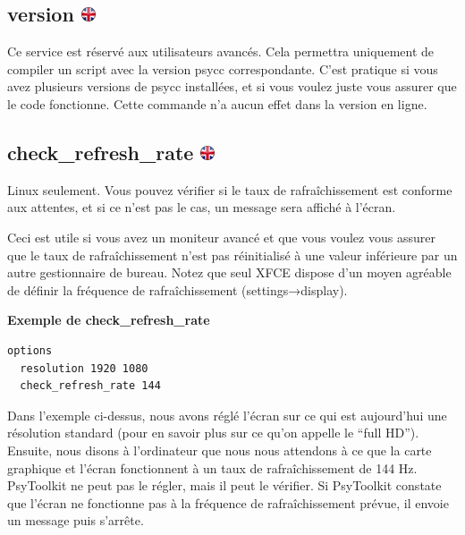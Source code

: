 \documentclass[
]{book}
\begin{document}
\hypertarget{version}{%
\subsection[version ]{\texorpdfstring{version
\href{https://www.psytoolkit.org/doc3.2.0/syntax.html\#options-version}{\protect\includegraphics{img/ukflag.png}}}{version }}\label{version}}

Ce service est réservé aux utilisateurs avancés. Cela permettra
uniquement de compiler un script avec la version psycc correspondante.
C'est pratique si vous avez plusieurs versions de psycc installées, et
si vous voulez juste vous assurer que le code fonctionne. Cette commande
n'a aucun effet dans la version en ligne.

\hypertarget{check_refresh_rate}{%
\subsection[check\_refresh\_rate ]{\texorpdfstring{check\_refresh\_rate
\href{https://www.psytoolkit.org/doc3.2.0/syntax.html\#options-check-refresh-rate}{\protect\includegraphics{img/ukflag.png}}}{check\_refresh\_rate }}\label{check_refresh_rate}}

Linux seulement. Vous pouvez vérifier si le taux de rafraîchissement est
conforme aux attentes, et si ce n'est pas le cas, un message sera
affiché à l'écran.

Ceci est utile si vous avez un moniteur avancé et que vous voulez vous
assurer que le taux de rafraîchissement n'est pas réinitialisé à une
valeur inférieure par un autre gestionnaire de bureau. Notez que seul
XFCE dispose d'un moyen agréable de définir la fréquence de
rafraîchissement (settings→display).

\textbf{Exemple de check\_refresh\_rate}

\begin{verbatim}
options
  resolution 1920 1080
  check_refresh_rate 144
\end{verbatim}

Dans l'exemple ci-dessus, nous avons réglé l'écran sur ce qui est
aujourd'hui une résolution standard (pour en savoir plus sur ce qu'on
appelle le ``full HD''). Ensuite, nous disons à l'ordinateur que nous
nous attendons à ce que la carte graphique et l'écran fonctionnent à un
taux de rafraîchissement de 144 Hz. PsyToolkit ne peut pas le régler,
mais il peut le vérifier. Si PsyToolkit constate que l'écran ne
fonctionne pas à la fréquence de rafraîchissement prévue, il envoie un
message puis s'arrête.
\end{document}
